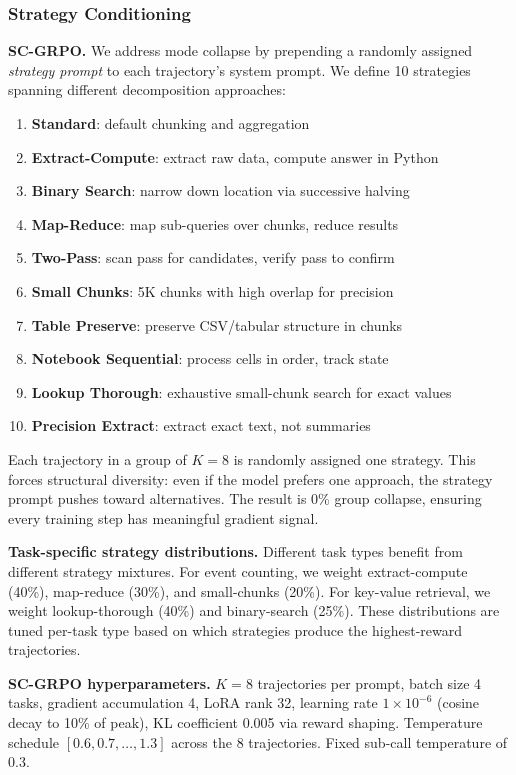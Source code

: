 \documentclass{article}
\begin{document}
\subsubsection{Strategy Conditioning}

\textbf{SC-GRPO.} We address mode collapse by prepending a randomly assigned \emph{strategy prompt} to each trajectory's system prompt. We define 10 strategies spanning different decomposition approaches:

\begin{enumerate}
    \item \textbf{Standard}: default chunking and aggregation
    \item \textbf{Extract-Compute}: extract raw data, compute answer in Python
    \item \textbf{Binary Search}: narrow down location via successive halving
    \item \textbf{Map-Reduce}: map sub-queries over chunks, reduce results
    \item \textbf{Two-Pass}: scan pass for candidates, verify pass to confirm
    \item \textbf{Small Chunks}: 5K chunks with high overlap for precision
    \item \textbf{Table Preserve}: preserve CSV/tabular structure in chunks
    \item \textbf{Notebook Sequential}: process cells in order, track state
    \item \textbf{Lookup Thorough}: exhaustive small-chunk search for exact values
    \item \textbf{Precision Extract}: extract exact text, not summaries
\end{enumerate}

Each trajectory in a group of $K{=}8$ is randomly assigned one strategy. This forces structural diversity: even if the model prefers one approach, the strategy prompt pushes toward alternatives. The result is 0\% group collapse, ensuring every training step has meaningful gradient signal.

\textbf{Task-specific strategy distributions.} Different task types benefit from different strategy mixtures. For event counting, we weight extract-compute (40\%), map-reduce (30\%), and small-chunks (20\%). For key-value retrieval, we weight lookup-thorough (40\%) and binary-search (25\%). These distributions are tuned per-task type based on which strategies produce the highest-reward trajectories.

\textbf{SC-GRPO hyperparameters.} $K{=}8$ trajectories per prompt, batch size 4 tasks, gradient accumulation 4, LoRA rank 32, learning rate $1{\times}10^{-6}$ (cosine decay to 10\% of peak), KL coefficient 0.005 via reward shaping. Temperature schedule $[0.6, 0.7, \ldots, 1.3]$ across the 8 trajectories. Fixed sub-call temperature of 0.3.
\end{document}

